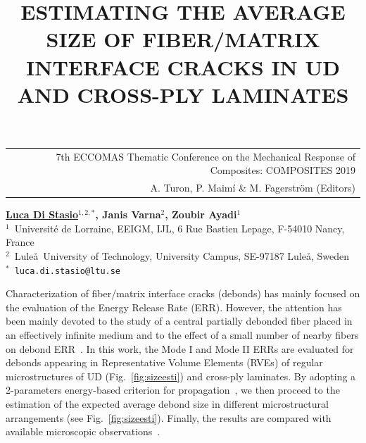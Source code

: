 \documentclass[12pt,a4paper]{article}
\begin{document}
\thispagestyle{empty}

\vspace*{-3.4cm}
\begin{table}[!h]
\begin{tabular}{r}
\hspace*{2.9cm} \scriptsize \textsf{7th ECCOMAS Thematic Conference on the Mechanical Response of Composites: COMPOSITES 2019} \\
\hspace*{2.9cm} \tiny \textsf{A. Turon, P. Maimí \& M. Fagerström (Editors)}
\end{tabular}
\end{table}

\vspace*{-0.7cm}

\begin{center}
\title{ESTIMATING THE AVERAGE SIZE OF FIBER/MATRIX INTERFACE CRACKS IN UD AND CROSS-PLY LAMINATES}
\end{center}
\begin{center}
\textbf{\underline{Luca Di Stasio}$^{1,2,*}$, Janis Varna$^{2}$, Zoubir Ayadi$^{1}$} \\ [7pt]
\small{$^1$~Universit\'e de Lorraine, EEIGM, IJL, 6 Rue Bastien Lepage, F-54010 Nancy, France}  \\  [2pt]
\small{$^2$~Lule\aa\ University of Technology, University Campus, SE-97187 Lule\aa, Sweden}  \\  [2pt]
\small{$^*$~\texttt{luca.di.stasio@ltu.se}} \\
\end{center}

\noindent
Characterization of fiber/matrix interface cracks (debonds) has mainly focused on the evaluation of the Energy Release Rate (ERR). However, the attention has been mainly devoted to the study of a central partially debonded fiber placed in an effectively infinite medium and to the effect of a small number of nearby fibers on debond ERR~\cite{Sandino2016}. In this work, the Mode I and Mode II ERRs are evaluated for debonds appearing in Representative Volume Elements (RVEs) of regular microstructures of UD (Fig.~\ref{fig:sizeesti}) and cross-ply laminates. By adopting a 2-parameters energy-based criterion for propagation~\cite{Hutchinson1992}, we then proceed to the estimation of the expected average debond size in different microstructural arrangements (see Fig.~\ref{fig:sizeesti}). Finally, the results are compared with available microscopic observations~\cite{Correa2018}.
\end{document}

